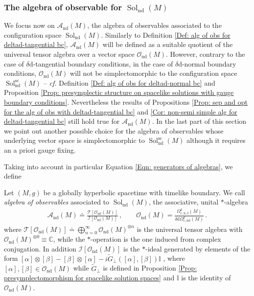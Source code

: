 \subsubsection{The algebra of observable for $\operatorname{Sol}_{\mathrm{nd}}(M)$}\label{Sec: the alg of obs for deltad-normal bc}

We focus now on $\mathcal{A}_{\mathrm{nd}}(M)$, the algebra of observables associated to the configuration space $\operatorname{Sol}_{\mathrm{nd}}(M)$.
Similarly to Definition \ref{Def: alg of obs for deltad-tangential bc}, $\mathcal{A}_{\mathrm{nd}}(M)$ will be defined as a suitable quotient of the universal tensor algebra over a vector space $\mathcal{O}_{\mathrm{nd}}(M)$.
However, contrary to the case of $\delta\mathrm{d}$-tangential boundary conditions, in the case of $\delta\mathrm{d}$-normal boundary conditions, $\mathcal{O}_{\mathrm{nd}}(M)$ will not be simplectomorphic to the configuration space $\operatorname{Sol}_{\mathrm{nd}}^{\mathrm{sc}}(M)$ -- \textit{cf.} Definition \ref{Def: alg of obs for deltad-normal bc} and Proposition \ref{Prop: presymplectic structure on spacelike solutions with gauge boundary conditions}.
Nevertheless the results of Propositions \ref{Prop: sep and opt for the alg of obs with deltad-tangential bc} and \ref{Cor: non-semi simple alg for deltad-tangential bc} still hold true for $\mathcal{A}_{\mathrm{nd}}(M)$.
In the last part of this section we point out another possible choice for the algebra of observables whose underlying vector space is simplectomorphic to $\operatorname{Sol}_{\mathrm{nd}}^{\mathrm{sc}}(M)$ although it requires an a priori gauge fixing.

Taking into account in particular Equation \eqref{Eqn: generators of algebras}, we define

\begin{Definition}\label{Def: alg of obs for deltad-normal bc}
	Let $(M,g)$ be a globally hyperbolic spacetime with timelike boundary.
	We call {\em algebra of observables} associated to $\operatorname{Sol}_{\mathrm{nd}}(M)$, the associative, unital $*$-algebra 
	\begin{align}
	\mathcal{A}_{\mathrm{nd}}(M)\doteq
	\frac{\mathcal{T}[\mathcal{O}_{\mathrm{nd}}(M)]}{\mathcal{I}[\mathcal{O}_{\mathrm{nd}}(M)]}\,,\qquad
	\mathcal{O}_{\mathrm{nd}}(M)=
	\frac{\Omega_{\mathrm{c,n},\delta}^k(M)}{\delta\mathrm{d}\Omega_{\mathrm{c,nd}}^k(M)}\,.
	\end{align}
	where $\mathcal{T}[\mathcal{O}_{\mathrm{nd}}(M)]\doteq\bigoplus_{n=0}^\infty\mathcal{O}_{\mathrm{nd}}(M)^{\otimes n}$ is the universal tensor algebra with
	$\mathcal{O}_{\mathrm{nd}}(M)^{\otimes 0}\equiv\mathbb{C}$, while the $*$-operation is the one induced from complex conjugation.
	In addition
	$\mathcal{I}[\mathcal{O}_{\mathrm{nd}}(M)]$ is the $*$-ideal generated by elements of the form
	$[\alpha]\otimes[\beta]-[\beta]\otimes[\alpha]-i \widetilde{G}_\perp([\alpha],[\beta])\mathbb{I}$ , where $[\alpha],[\beta]\in\mathcal{O}_{\mathrm{nd}}(M)$ while $\widetilde{G}_\perp$ is defined in Proposition \ref{Prop: presymplectomorphism for spacelike solution spaces} and $\mathbb{I}$ is the identity of $\mathcal{O}_{\mathrm{nd}}(M)$.
\end{Definition}



